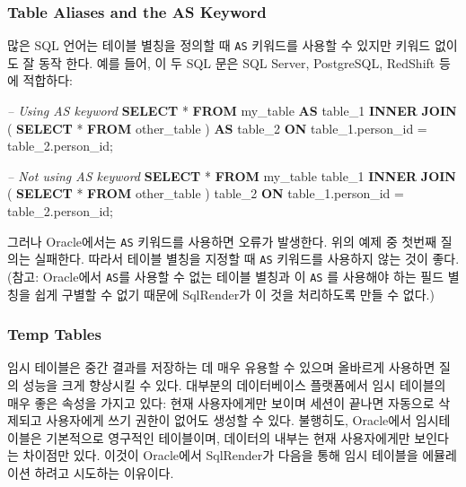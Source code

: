 \documentclass[11pt]{book}
\newenvironment{Shaded}{\begin{snugshade}}{\end{snugshade}}
\newcommand{\KeywordTok}[1]{\textcolor[rgb]{0.13,0.29,0.53}{\textbf{#1}}}
\newcommand{\DecValTok}[1]{\textcolor[rgb]{0.00,0.00,0.81}{#1}}
\newcommand{\CommentTok}[1]{\textcolor[rgb]{0.56,0.35,0.01}{\textit{#1}}}
\newcommand{\NormalTok}[1]{#1}
\theoremstyle{definition}
\theoremstyle{definition}
\theoremstyle{definition}
\theoremstyle{remark}
\begin{document}
\subsubsection*{Table Aliases and the AS
Keyword}\label{table-aliases-and-the-as-keyword}

많은 SQL 언어는 테이블 별칭을 정의할 때 \texttt{AS} 키워드를 사용할 수
있지만 키워드 없이도 잘 동작 한다. 예를 들어, 이 두 SQL 문은 SQL Server,
PostgreSQL, RedShift 등에 적합하다:

\begin{Shaded}
\begin{Highlighting}[]
\CommentTok{-- Using AS keyword}
\KeywordTok{SELECT}\NormalTok{ * }
\KeywordTok{FROM}\NormalTok{ my_table }\KeywordTok{AS}\NormalTok{ table_}\DecValTok{1}
\KeywordTok{INNER} \KeywordTok{JOIN}\NormalTok{ (}
  \KeywordTok{SELECT}\NormalTok{ * }\KeywordTok{FROM}\NormalTok{ other_table}
\NormalTok{) }\KeywordTok{AS}\NormalTok{ table_}\DecValTok{2}
\KeywordTok{ON}\NormalTok{ table_1.person_id = table_2.person_id;}

\CommentTok{-- Not using AS keyword}
\KeywordTok{SELECT}\NormalTok{ * }
\KeywordTok{FROM}\NormalTok{ my_table table_}\DecValTok{1}
\KeywordTok{INNER} \KeywordTok{JOIN}\NormalTok{ (}
  \KeywordTok{SELECT}\NormalTok{ * }\KeywordTok{FROM}\NormalTok{ other_table}
\NormalTok{) table_}\DecValTok{2}
\KeywordTok{ON}\NormalTok{ table_1.person_id = table_2.person_id;}
\end{Highlighting}
\end{Shaded}

그러나 Oracle에서는 \texttt{AS} 키워드를 사용하면 오류가 발생한다. 위의
예제 중 첫번째 질의는 실패한다. 따라서 테이블 별칭을 지정할 때
\texttt{AS} 키워드를 사용하지 않는 것이 좋다. (참고: Oracle에서
\texttt{AS}를 사용할 수 없는 테이블 별칭과 이 \texttt{AS} 를 사용해야
하는 필드 별칭을 쉽게 구별할 수 없기 때문에 SqlRender가 이 것을
처리하도록 만들 수 없다.)

\subsubsection*{Temp Tables}\label{temp-tables}

임시 테이블은 중간 결과를 저장하는 데 매우 유용할 수 있으며 올바르게
사용하면 질의 성능을 크게 향상시킬 수 있다. 대부분의 데이터베이스
플랫폼에서 임시 테이블의 매우 좋은 속성을 가지고 있다: 현재 사용자에게만
보이며 세션이 끝나면 자동으로 삭제되고 사용자에게 쓰기 권한이 없어도
생성할 수 있다. 불행히도, Oracle에서 임시테이블은 기본적으로 영구적인
테이블이며, 데이터의 내부는 현재 사용자에게만 보인다는 차이점만 있다.
이것이 Oracle에서 SqlRender가 다음을 통해 임시 테이블을 에뮬레이션
하려고 시도하는 이유이다.
\end{document}

